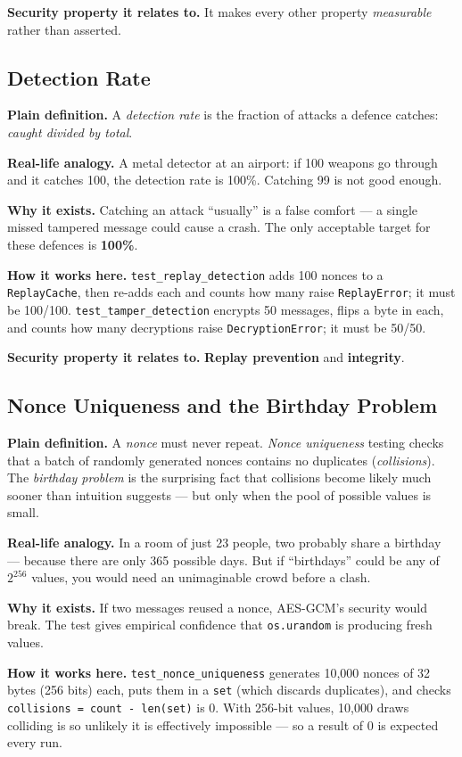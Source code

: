 \documentclass[11pt,a4paper]{report}
\begin{document}
\textbf{Security property it relates to.} It makes every other property
\emph{measurable} rather than asserted.

\subsection{Detection Rate}
\textbf{Plain definition.} A \emph{detection rate} is the fraction of attacks a
defence catches: \emph{caught divided by total}.

\textbf{Real-life analogy.} A metal detector at an airport: if 100 weapons go
through and it catches 100, the detection rate is 100\%. Catching 99 is not good
enough.

\textbf{Why it exists.} Catching an attack ``usually'' is a false comfort --- a
single missed tampered message could cause a crash. The only acceptable target
for these defences is \textbf{100\%}.

\textbf{How it works here.} \texttt{test\_replay\_detection} adds 100 nonces to a
\texttt{ReplayCache}, then re-adds each and counts how many raise
\texttt{ReplayError}; it must be 100/100. \texttt{test\_tamper\_detection}
encrypts 50 messages, flips a byte in each, and counts how many decryptions
raise \texttt{DecryptionError}; it must be 50/50.

\textbf{Security property it relates to.} \textbf{Replay prevention} and
\textbf{integrity}.

\subsection{Nonce Uniqueness and the Birthday Problem}
\textbf{Plain definition.} A \emph{nonce} must never repeat. \emph{Nonce
uniqueness} testing checks that a batch of randomly generated nonces contains no
duplicates (\emph{collisions}). The \emph{birthday problem} is the surprising
fact that collisions become likely much sooner than intuition suggests --- but
only when the pool of possible values is small.

\textbf{Real-life analogy.} In a room of just 23 people, two probably share a
birthday --- because there are only 365 possible days. But if ``birthdays'' could
be any of $2^{256}$ values, you would need an unimaginable crowd before a clash.

\textbf{Why it exists.} If two messages reused a nonce, AES-GCM's security would
break. The test gives empirical confidence that \texttt{os.urandom} is producing
fresh values.

\textbf{How it works here.} \texttt{test\_nonce\_uniqueness} generates 10{,}000
nonces of 32 bytes (256 bits) each, puts them in a \texttt{set} (which discards
duplicates), and checks \texttt{collisions = count - len(set)} is 0. With 256-bit
values, 10{,}000 draws colliding is so unlikely it is effectively impossible ---
so a result of 0 is expected every run.
\end{document}
